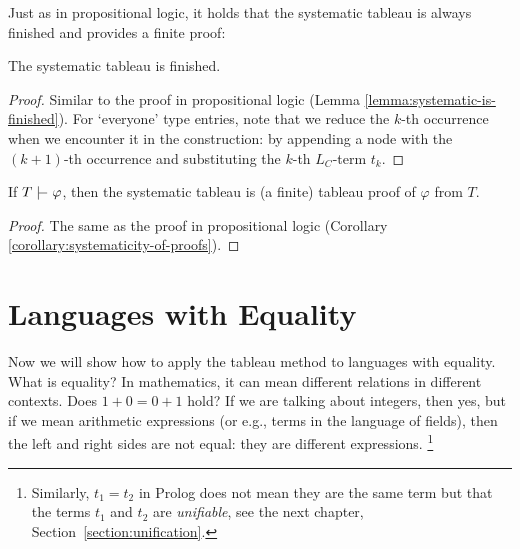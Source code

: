 Just as in propositional logic, it holds that the systematic tableau is always finished and provides a finite proof:

\begin{lemma}\label{lemma:systematic-is-finished-predicate}
    The systematic tableau is finished.
\end{lemma}
\begin{proof}
    Similar to the proof in propositional logic (Lemma \ref{lemma:systematic-is-finished}). For `everyone' type entries, note that we reduce the $k$-th occurrence when we encounter it in the construction: by appending a node with the $(k+1)$-th occurrence and substituting the $k$-th $L_C$-term $t_k$.
\end{proof}

\begin{corollary}\label{corollary:systematicity-of-proofs-predicate}
    If $T\proves\varphi$, then the systematic tableau is (a finite) tableau proof of $\varphi$ from $T$.
\end{corollary}
\begin{proof}
    The same as the proof in propositional logic (Corollary \ref{corollary:systematicity-of-proofs}).
\end{proof}


\section{Languages with Equality} \label{section:tableaux-equality}

Now we will show how to apply the tableau method to languages with equality. What is equality? In mathematics, it can mean different relations in different contexts. Does $1+0=0+1$ hold? If we are talking about integers, then yes, but if we mean arithmetic expressions (or e.g., terms in the language of fields), then the left and right sides are not equal: they are different expressions. \footnote{Similarly, $t_1=t_2$ in Prolog does not mean they are the same term but that the terms $t_1$ and $t_2$ are \emph{unifiable}, see the next chapter, Section~\ref{section:unification}.}

